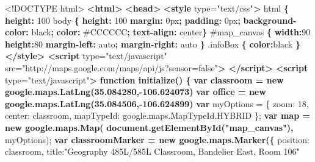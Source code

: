 \documentclass[]{article}
\newenvironment{Shaded}{}{}
\newcommand{\KeywordTok}[1]{\textcolor[rgb]{0.00,0.44,0.13}{\textbf{{#1}}}}
\newcommand{\DataTypeTok}[1]{\textcolor[rgb]{0.56,0.13,0.00}{{#1}}}
\newcommand{\DecValTok}[1]{\textcolor[rgb]{0.25,0.63,0.44}{{#1}}}
\newcommand{\FloatTok}[1]{\textcolor[rgb]{0.25,0.63,0.44}{{#1}}}
\newcommand{\StringTok}[1]{\textcolor[rgb]{0.25,0.44,0.63}{{#1}}}
\newcommand{\OtherTok}[1]{\textcolor[rgb]{0.00,0.44,0.13}{{#1}}}
\newcommand{\FunctionTok}[1]{\textcolor[rgb]{0.02,0.16,0.49}{{#1}}}
\newcommand{\ErrorTok}[1]{\textcolor[rgb]{1.00,0.00,0.00}{\textbf{{#1}}}}
\newcommand{\NormalTok}[1]{{#1}}
\begin{document}
\begin{Shaded}
\begin{Highlighting}[numbers=left,,]
\DataTypeTok{<!DOCTYPE }\NormalTok{html}\DataTypeTok{>}
\KeywordTok{<html>}
    \KeywordTok{<head>}
        \KeywordTok{<style}\OtherTok{ type=}\StringTok{"text/css"}\KeywordTok{>}
          \NormalTok{html }\KeywordTok{\{} \KeywordTok{height:} \DataTypeTok{100%
          \NormalTok{body }\KeywordTok{\{} \KeywordTok{height:} \DataTypeTok{100%
            \KeywordTok{margin:} \DataTypeTok{0px}\KeywordTok{;} 
            \KeywordTok{padding:} \DataTypeTok{0px}\KeywordTok{;} 
            \KeywordTok{background-color:} \DataTypeTok{black}\KeywordTok{;} 
            \KeywordTok{color:} \DataTypeTok{#CCCCCC}\KeywordTok{;}
            \KeywordTok{text-align:} \DataTypeTok{center}\KeywordTok{\}}
          \FloatTok{#map_canvas} \KeywordTok{\{} \KeywordTok{width:}\DataTypeTok{90%
            \KeywordTok{height:}\DataTypeTok{80%
            \KeywordTok{margin-left:} \DataTypeTok{auto}\KeywordTok{;} 
            \KeywordTok{margin-right:} \DataTypeTok{auto} \KeywordTok{\}}
          \FloatTok{.infoBox} \KeywordTok{\{} \KeywordTok{color:}\DataTypeTok{black} \KeywordTok{\}}
        \KeywordTok{</style>}
        \KeywordTok{<script}\OtherTok{ type=}\StringTok{"text/javascript"}
\OtherTok{            src=}\StringTok{"http://maps.google.com/maps/api/js?sensor=false"}\KeywordTok{>}
        \KeywordTok{</script>}
        \KeywordTok{<script}\OtherTok{ type=}\StringTok{"text/javascript"}\KeywordTok{>}
\ErrorTok{          function initialize() \{}
\ErrorTok{            var classroom = new google.maps.LatLng(35.084280,-106.624073)}
\ErrorTok{            var office = new google.maps.LatLng(35.084506,-106.624899)}
            \KeywordTok{var} \NormalTok{myOptions = \{}
              \DataTypeTok{zoom}\NormalTok{: }\DecValTok{18}\NormalTok{,}
              \DataTypeTok{center}\NormalTok{: classroom,}
              \DataTypeTok{mapTypeId}\NormalTok{: }\OtherTok{google}\NormalTok{.}\OtherTok{maps}\NormalTok{.}\OtherTok{MapTypeId}\NormalTok{.}\FunctionTok{HYBRID}
              \NormalTok{\};}
\ErrorTok{            var map = new google.maps.Map(}
\ErrorTok{              document.getElementById("map_canvas"), }
              \NormalTok{myOptions);}
\ErrorTok{            var classroomMarker = new google.maps.Marker(\{}
              \NormalTok{position: classroom,}
              \NormalTok{title:}\StringTok{"Geography 485L/585L Classroom, Bandelier East, Room 106"}
}}}}
\end{Highlighting}
\end{Shaded}
\end{document}

